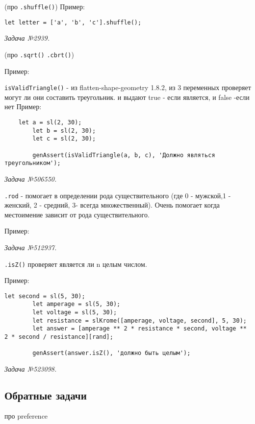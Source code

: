 (про \texttt{.shuffle()})
Пример:
\begin{lstlisting}
let letter = ['a', 'b', 'c'].shuffle();
\end{lstlisting}
\textsl{Задача №2939.}
 

(про \texttt{.sqrt()} \texttt{.cbrt()})

Пример:
 


\texttt{isValidTriangle()} - из  flatten-shape-geometry 1.8.2, из 3 переменных проверяет могут ли они составить треугольник. и выдают true - если является, и false -если нет
Пример:
\begin{lstlisting}
	let a = sl(2, 30);
		let b = sl(2, 30);
		let c = sl(2, 30);

		genAssert(isValidTriangle(a, b, c), 'Должно являться треугольником');
\end{lstlisting}
\textsl{Задача №506550.}

\texttt{.rod} - помогает в определении рода существительного (где 0 - мужской,1 - женский, 2 - средний, 3- всегда множественный). Очень помогает когда местоимение зависит от рода существительного.

Пример:
 
\textsl{Задача №512937.}

\texttt{.isZ()} проверяет является ли n целым числом.  

Пример:
\begin{lstlisting}
let second = sl(5, 30);
		let amperage = sl(5, 30);
		let voltage = sl(5, 30);
		let resistance = slKrome([amperage, voltage, second], 5, 30);
		let answer = [amperage ** 2 * resistance * second, voltage ** 2 * second / resistance][rand];

		genAssert(answer.isZ(), 'должно быть целым');
\end{lstlisting}
\textsl{Задача №523098.}




\subsection{Обратные задачи}
про preference %
 
